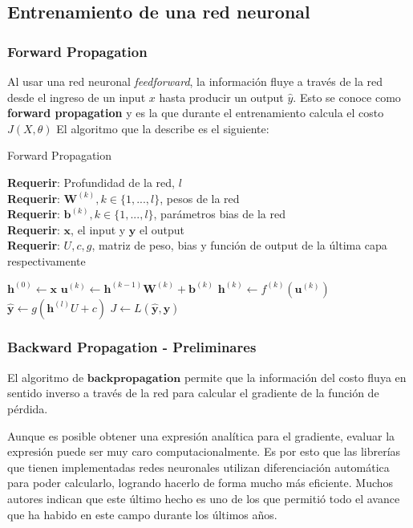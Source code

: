 \subsection{Entrenamiento de una red neuronal}

\subsubsection{Forward Propagation}

Al usar una red neuronal \textit{feedforward}, la información fluye a través de la red desde el ingreso de un input $x$ hasta producir un output $\hat{y}$. Esto se conoce como \textbf{forward propagation} y es la que durante el entrenamiento calcula el costo $J(X, \theta)$ 
El algoritmo que la describe es el siguiente:

\begin{algorithm}[H] %
	\caption{Forward Propagation}
	\textbf{Requerir}: Profundidad de la red, $l$ \\
	\textbf{Requerir}: $\bm{W}^{(k)}, k \in \{1,...,l\}$, pesos de la red \\
	\textbf{Requerir}: $\bm{b}^{(k)}, k \in \{1,...,l\}$, parámetros bias de la red \\
	\textbf{Requerir}: $\bm{x}$, el input y $\bm{y}$ el output \\
	\textbf{Requerir}: $U,c,g$, matriz de peso, bias y función de output de la última capa respectivamente 
	\begin{algorithmic}[1]
		\State $\bm{h}^{(0)} \gets \bm{x}$
			\State $\bm{u}^{(k)} \gets  \bm{h}^{(k-1)}\bm{W}^{(k)} + \bm{b}^{(k)}$
			\State $\bm{h}^{(k)} \gets f^{(k)}(\bm{u}^{(k)})$
		\EndFor
		\State $\bm{\hat{y}} \gets g(\bm{h}^{(l)}U+c)$
		\State $J \gets L(\bm{\hat{y}},\bm{y})$
	\end{algorithmic}

\end{algorithm}


\subsubsection{Backward Propagation - Preliminares}

El algoritmo de $\textbf{backpropagation}$ permite que la información del costo fluya en sentido inverso a través de la red para calcular el gradiente de la función de pérdida.

Aunque es posible obtener una expresión analítica para el gradiente, evaluar la expresión puede ser muy caro computacionalmente.  Es por esto que las librerías que tienen implementadas redes neuronales utilizan diferenciación automática para poder calcularlo, logrando hacerlo de forma mucho más eficiente. Muchos autores indican que este último hecho es uno de los que permitió todo el avance que ha habido en este campo durante los últimos años.  

